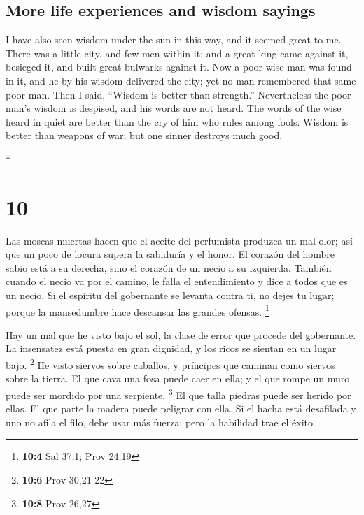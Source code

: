 \begin{paracol}{2}
\begin{otherlanguage}{english}
\hypertarget{more-life-experiences-and-wisdom-sayings}{%
\subsection{More life experiences and wisdom
sayings}\label{more-life-experiences-and-wisdom-sayings}}

 I have also seen wisdom under the sun in this way, and
it seemed great to me.  There was a little city, and few
men within it; and a great king came against it, besieged it, and built
great bulwarks against it.  Now a poor wise man was found
in it, and he by his wisdom delivered the city; yet no man remembered
that same poor man.  Then I said, ``Wisdom is better than
strength.'' Nevertheless the poor man's wisdom is despised, and his
words are not heard.  The words of the wise heard in
quiet are better than the cry of him who rules among fools.
 Wisdom is better than weapons of war; but one sinner
destroys much good.

\end{otherlanguage}

\switchcolumn[0]*

\hypertarget{section-18}{%
\section{10}\label{section-18}}

 Las moscas muertas hacen que el aceite del perfumista
produzca un mal olor; así que un poco de locura supera la sabiduría y el
honor.  El corazón del hombre sabio está a su derecha,
sino el corazón de un necio a su izquierda.  También
cuando el necio va por el camino, le falla el entendimiento y dice a
todos que es un necio.  Si el espíritu del gobernante se
levanta contra ti, no dejes tu lugar; porque la mansedumbre hace
descansar las grandes ofensas. \footnote{\textbf{10:4} Sal 37,1; Prov
  24,19}

 Hay un mal que he visto bajo el sol, la clase de error
que procede del gobernante.  La insensatez está puesta en
gran dignidad, y los ricos se sientan en un lugar bajo. \footnote{\textbf{10:6}
  Prov 30,21-22}  He visto siervos sobre caballos, y
príncipes que caminan como siervos sobre la tierra.  El
que cava una fosa puede caer en ella; y el que rompe un muro puede ser
mordido por una serpiente. \footnote{\textbf{10:8} Prov 26,27}
 El que talla piedras puede ser herido por ellas. El que
parte la madera puede peligrar con ella.  Si el hacha
está desafilada y uno no afila el filo, debe usar más fuerza; pero la
habilidad trae el éxito.


\end{paracol}
